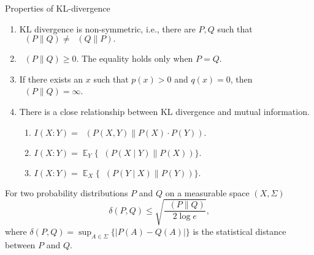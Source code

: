 \documentclass[aspectratio=169]{beamer}
\DeclareMathOperator*{\E}{\mathbb{E}}
\DeclareMathOperator{\KL}{D_{KL}}
\newcommand{\midd}{\parallel}
\begin{document}
\begin{frame}{Properties of KL-divergence}
    \begin{enumerate}
        \item KL divergence is non-symmetric, i.e., there are $P,Q$ such that
        $\KL(P\midd Q) \neq \KL(Q\midd P).$

        \item
        $\KL(P\midd Q) \geq 0.$
        The equality holds only when $P=Q$.

        \item If there exists an $x$ such that $p(x)>0$ and $q(x)=0$, then $\KL(P\midd Q) = \infty$.

        \item There is a close relationship between KL divergence and mutual information.
        \begin{enumerate}
            \item $I(X:Y) = \KL(P(X, Y)\midd P(X)\cdot P(Y)).$\label{lst:KL-prop:3-1}
            \item $I(X:Y) = \E_Y \{ \KL(P(X \mid Y) \midd P(X)) \}.$\label{lst:KL-prop:3-2}
            \item $I(X:Y) = \E_X \{ \KL(P(Y \mid X) \midd P(Y)) \}.$\label{lst:KL-prop:3-3}
        \end{enumerate}
    \end{enumerate}
    \begin{theorem}
        For two probability distributions $P$ and $Q$ on a measurable space $(X,\Sigma)$
        \[
        \delta (P,Q)\leq \sqrt{\frac{\KL(P\midd Q)}{2\log e}},
        \]
        where $\delta (P,Q)=\sup_{A\in \Sigma} \bigl \{ |P(A)-Q(A)|\bigr \}$ is the statistical distance between $P$ and $Q$.
    \end{theorem}
\end{frame}
\end{document}
